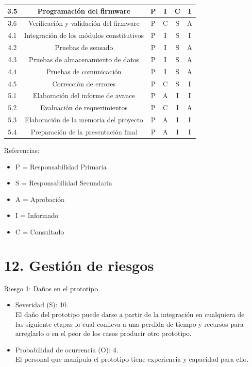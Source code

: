 \documentclass[11pt]{charter}
\begin{document}
\begin{table}[htpb]
{\begin{tabular}{|c|c|c|c|c|c|}
3.5 & Programación del firmware & P & I & C & I \\ \hline
3.6 & Verificación y validación del firmware & P & C & S & A \\ \hline
4.1 & Integración de los módulos constitutivos & P & I & S & I \\ \hline
4.2 & Pruebas de sensado & P & I & S & A \\ \hline
4.3 & Pruebas de almacenamiento de datos& P & I & S & A \\ \hline
4.4 & Pruebas de comunicación & P & I & S & A \\ \hline
4.5 & Corrección de errores & P & C & S & I \\ \hline
5.1 & Elaboración del informe de avance& P & A & I & I \\ \hline
5.2 & Evaluación de requerimientos & P & C & I & A \\ \hline
5.3 & Elaboración de la memoria del proyecto & P & A & I & I \\ \hline
5.4 & Preparación de la presentación final & P & A & I & I \\ \hline\end{tabular}%
}
\end{table}

{\footnotesize
Referencias:
\begin{itemize}
	\item P = Responsabilidad Primaria
	\item S = Responsabilidad Secundaria
	\item A = Aprobación
	\item I = Informado
	\item C = Consultado
\end{itemize}
} %


\section{12. Gestión de riesgos}
\label{sec:riesgos}

 
Riesgo 1: Daños en el prototipo
\begin{itemize}
\item Severidad (S): 10.\\
El daño del prototipo puede darse a partir de la integración en cualquiera de las siguiente etapas lo cual conlleva a una perdida de tiempo y recursos para arreglarlo o en el peor de los casos producir otro prototipo.
\item Probabilidad de ocurrencia (O): 4.\\
El personal que manipula el prototipo tiene experiencia y capacidad para ello. 
\end{itemize}   
\end{document}
